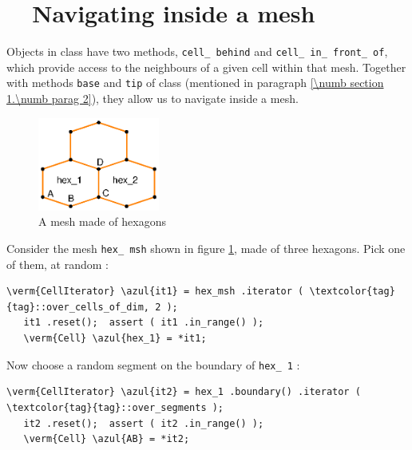 \section{~~Navigating inside a mesh}\label{\numb section 9.\numb parag 6}

Objects in class {\small\tt {}} have two methods, {\small\tt cell\_\,behind} and
{\small\tt cell\_\,in\_\,front\_\,of},
which provide access to the neighbours of a given cell within that mesh.
Together with methods {\small\tt base} and {\small\tt tip} of class {\small\tt {}}
(mentioned in paragraph \ref{\numb section 1.\numb parag 2}), they allow us to navigate inside
a mesh.

\begin{figure}[ht] \centering
  \includegraphics[width=40mm]{malha-hex}
  \caption{A mesh made of hexagons}
  \label{\numb section 9.\numb fig 3}
\end{figure}

Consider the mesh {\small\tt hex\_\,msh} shown in figure \ref{\numb section 9.\numb fig 3},
made of three hexagons.
Pick one of them, at random :

\begin{Verbatim}[commandchars=\\\{\},formatcom=\small\tt,
   baselinestretch=0.94,framesep=2mm                      ]
   \verm{CellIterator} \azul{it1} = hex_msh .iterator ( \textcolor{tag}{tag}::over_cells_of_dim, 2 );
   it1 .reset();  assert ( it1 .in_range() );
   \verm{Cell} \azul{hex_1} = *it1;
\end{Verbatim}

Now choose a random segment on the boundary of {\small\tt hex\_\,1} :

\begin{Verbatim}[commandchars=\\\{\},formatcom=\small\tt,
   baselinestretch=0.94,framesep=2mm                      ]
   \verm{CellIterator} \azul{it2} = hex_1 .boundary() .iterator ( \textcolor{tag}{tag}::over_segments );
   it2 .reset();  assert ( it2 .in_range() );
   \verm{Cell} \azul{AB} = *it2;
\end{Verbatim}


